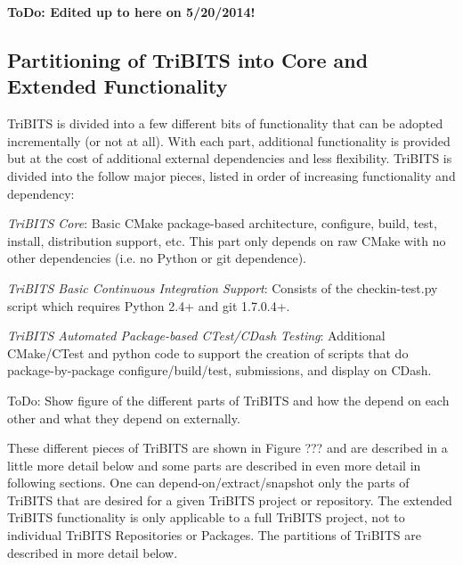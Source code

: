 \documentclass[note]{TechNote}
\begin{document}
\textbf{ToDo: Edited up to here on 5/20/2014!}

%
\subsection{Partitioning of TriBITS into Core and Extended Functionality}
%

TriBITS is divided into a few different bits of functionality that can be adopted incrementally (or not at all).  With each part, additional functionality is provided but at the cost of additional external dependencies and less flexibility.  TriBITS is divided into the follow major pieces, listed in order of increasing functionality and dependency:

\begin{compactitem}
\item\textit{TriBITS Core}: Basic CMake package-based architecture, configure, build, test, install, distribution support, etc.  This part only depends on raw CMake with no other dependencies (i.e. no Python or git dependence).
\item\textit{TriBITS Basic Continuous Integration Support}: Consists of the checkin-test.py script which requires Python 2.4+ and git 1.7.0.4+.
\item\textit{TriBITS Automated Package-based CTest/CDash Testing}: Additional CMake/CTest and python code to support the creation of  scripts that do package-by-package configure/build/test, submissions, and display on CDash.
\end{compactitem}

ToDo: Show figure of the different parts of TriBITS and how the depend on each other and what they depend on externally.

These different pieces of TriBITS are shown in Figure ??? and are described in a little more detail below and some parts are described in even more detail in following sections.  One can depend-on/extract/snapshot only the parts of TriBITS that are desired for a given TriBITS project or repository.  The extended TriBITS functionality is only applicable to a full TriBITS project, not to individual TriBITS Repositories or Packages.  The partitions of TriBITS are described in more detail below.
\end{document}
